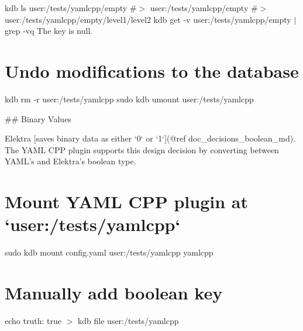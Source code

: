 kdb ls user\+:/tests/yamlcpp/empty \#$>$ user\+:/tests/yamlcpp/empty \#$>$ user\+:/tests/yamlcpp/empty/level1/level2 kdb get -\/v user\+:/tests/yamlcpp/empty $\vert$ grep -\/vq \textquotesingle{}The key is null.\textquotesingle{}\hypertarget{autotoc_md807_autotoc_md873}{}\section{Undo modifications to the database}\label{autotoc_md807_autotoc_md873}
kdb rm -\/r user\+:/tests/yamlcpp sudo kdb umount user\+:/tests/yamlcpp 
\begin{DoxyCode}
## Binary Values

Elektra [saves binary data as either `0` or `1`](@ref doc\_decisions\_boolean\_md). The YAML CPP plugin
       supports this design decision by converting between YAML’s and Elektra’s boolean type.
\end{DoxyCode}
 \hypertarget{autotoc_md807_autotoc_md874}{}\section{Mount Y\+A\+M\+L C\+P\+P plugin at `user\+:/tests/yamlcpp`}\label{autotoc_md807_autotoc_md874}
sudo kdb mount config.\+yaml user\+:/tests/yamlcpp yamlcpp \hypertarget{autotoc_md807_autotoc_md875}{}\section{Manually add boolean key}\label{autotoc_md807_autotoc_md875}
echo \textquotesingle{}truth\+: true\textquotesingle{} $>$ {\ttfamily kdb file user\+:/tests/yamlcpp}


